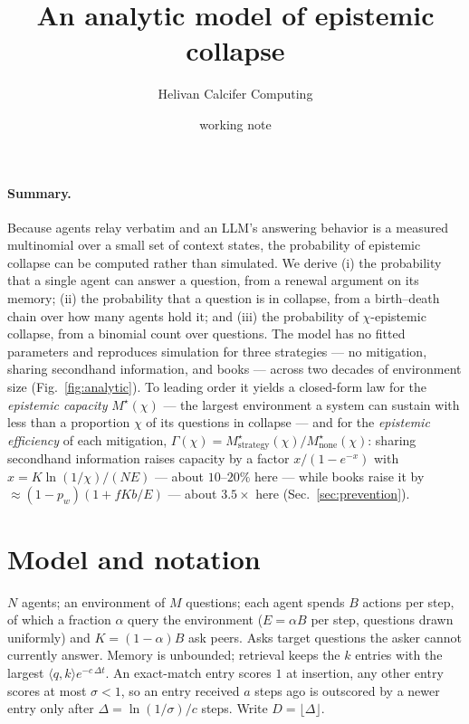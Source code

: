 \documentclass[10pt]{article}
\title{An analytic model of epistemic collapse}
\author{Helivan \quad Calcifer Computing}
\date{working note}
\begin{document}
\maketitle

\paragraph{Summary.}
Because agents relay verbatim and an LLM's answering behavior is a measured multinomial over a small set of context states, the probability of epistemic collapse can be computed rather than simulated. We derive (i) the probability that a single agent can answer a question, from a renewal argument on its memory; (ii) the probability that a question is in collapse, from a birth--death chain over how many agents hold it; and (iii) the probability of $\chi$-epistemic collapse, from a binomial count over questions. The model has no fitted parameters and reproduces simulation for three strategies --- no mitigation, sharing secondhand information, and books --- across two decades of environment size (Fig.~\ref{fig:analytic}). To leading order it yields a closed-form law for the \emph{epistemic capacity} $M^\star(\chi)$ --- the largest environment a system can sustain with less than a proportion $\chi$ of its questions in collapse --- and for the \emph{epistemic efficiency} of each mitigation, $\Gamma(\chi) = M^\star_{\text{strategy}}(\chi)/M^\star_{\text{none}}(\chi)$: sharing secondhand information raises capacity by a factor $x/(1-e^{-x})$ with $x = K\ln(1/\chi)/(NE)$ --- about $10$--$20\%$ here --- while books raise it by $\approx (1-p_w)(1 + fKb/E)$ --- about $3.5\times$ here (Sec.~\ref{sec:prevention}).

\section{Model and notation}
$N$ agents; an environment of $M$ questions; each agent spends $B$ actions per step, of which a fraction $\alpha$ query the environment ($E = \alpha B$ per step, questions drawn uniformly) and $K = (1-\alpha)B$ ask peers. Asks target questions the asker cannot currently answer. Memory is unbounded; retrieval keeps the $k$ entries with the largest $\langle q,k\rangle e^{-c\,\Delta t}$. An exact-match entry scores $1$ at insertion, any other entry scores at most $\sigma<1$, so an entry received $a$ steps ago is outscored by a newer entry only after $\Delta = \ln(1/\sigma)/c$ steps. Write $D = \lfloor \Delta \rfloor$.
\end{document}
